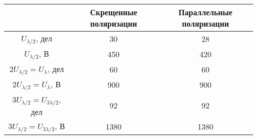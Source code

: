 \begin{tabular}{|c|c|c|}
\hline
&Скрещенные поляризации&Параллельные поляризации\\
\hline
$U_{\lambda/2}$, дел&30&28\\
\hline
$U_{\lambda/2}$, В&450&420\\
\hline
\hline
$2U_{\lambda/2} = U_\lambda$, дел&60&60\\
\hline
$2U_{\lambda/2} = U_\lambda$, В&900&900\\
\hline
\hline
$3U_{\lambda/2} = U_{3\lambda/2}$, дел&92&92\\
\hline
$3U_{\lambda/2} = U_{3\lambda/2}$, В&1380&1380\\
\hline
\end{tabular}